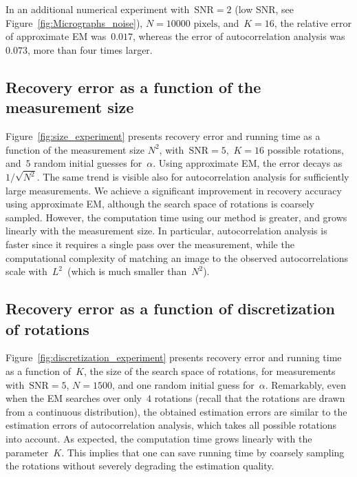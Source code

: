 \documentclass{article}
\begin{document}
In an additional numerical experiment with~$\text{SNR} = 2$ (low SNR, see Figure~\ref{fig:Micrographs_noise}), $N = 10000 \text{ pixels}$, and~\mbox{$K = 16$}, the relative error of approximate EM was~$\text{0.017}$, whereas the error of autocorrelation analysis was~$0.073$, more than four times larger.

\subsection{Recovery error as a function of the measurement size}
\label{subsec:exp_size}
Figure~\ref{fig:size_experiment} presents recovery error and running time as a function of the measurement size $N^2$, with~\mbox{$\text{SNR} = 5$},~\mbox{$K = 16$} possible rotations, and~$5$ random initial guesses for~$\alpha$. Using approximate EM, the error decays \mbox{as~$1 / \sqrt{N^2}$}. The same trend is visible also for autocorrelation analysis for sufficiently large measurements. We achieve a significant improvement in recovery accuracy using approximate EM, although the search space of rotations is coarsely sampled. However, the computation time using our method is greater, and grows linearly with the measurement size. In particular, autocorrelation analysis is faster since it requires a single pass over the measurement, while the computational complexity of matching an image to the observed autocorrelations scale with~$L^2$~(which is much smaller than~$N^2$).

\subsection{Recovery error as a function of discretization of rotations}
\label{subsec:exp_discretization}
Figure~\ref{fig:discretization_experiment} presents recovery error and running time as a function of~$K$, the size of the search space of rotations, for measurements with~\mbox{$\text{SNR} = 5$}, $N = 1500$, and one random initial guess for~$\alpha$. %
Remarkably, even when the EM searches over only~$4$ rotations (recall that the rotations are drawn from a continuous distribution), the obtained estimation errors are similar to the estimation errors of autocorrelation analysis, which takes all possible rotations into account. As expected, the computation time grows linearly with the parameter~$K$. This implies that one can save running time by coarsely sampling  the rotations without severely degrading  the estimation quality.
\end{document}
